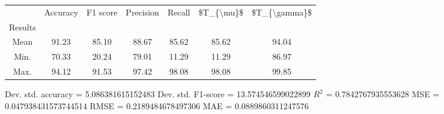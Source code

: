 \begin{tabular}{|c|c|c|c|c|c|c|}
\toprule
{} &  Accuracy &  F1 score &  Precision &  Recall &  \$T\_\{\textbackslash mu\}\$ &  \$T\_\{\textbackslash gamma\}\$ \\
Results &           &           &            &         &            &               \\
\hline
Mean    &     91.23 &     85.10 &      88.67 &   85.62 &      85.62 &         94.04 \\
Min.    &     70.33 &     20.24 &      79.01 &   11.29 &      11.29 &         86.97 \\
Max.    &     94.12 &     91.53 &      97.42 &   98.08 &      98.08 &         99.85 \\
\bottomrule
\end{tabular}

 Dev. std. accuracy = 5.086381615152483
 Dev. std. F1-score = 13.574546599022899
 $R^2$ = 0.7842767935553628
 MSE = 0.047938431573744514
 RMSE = 0.2189484678497306
 MAE = 0.0889860311247576